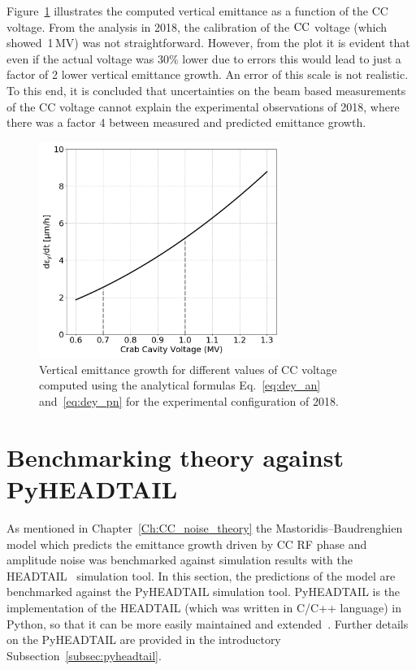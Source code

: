 Figure~\ref{fig:sensitivity_VCC_theory_bunch1} illustrates the computed vertical emittance as a function of the CC voltage. From the analysis in 2018, 
the calibration of the ${\mathrm{CC}}$ voltage (which showed~1\,MV) was not straightforward. However, from the plot it is evident that even if the actual voltage was 30$\%$ lower due to errors this would lead to just a factor of 2 lower vertical emittance growth. An error of this scale is not realistic. To this end, it is concluded that uncertainties on the beam based measurements of the CC voltage cannot explain the experimental observations of 2018, where there was a factor 4 between measured and predicted emittance growth.

\begin{figure}[!h]
    \centering         
    \includegraphics[width=0.7\textwidth]{images/Ch6/dey_vs_Vcc_Coast2-Setting2.png}
        \caption{Vertical emittance growth for different values of CC voltage computed using the analytical formulas Eq.~\eqref{eq:dey_an} and~\eqref{eq:dey_pn} for the experimental configuration of 2018.}
        \label{fig:sensitivity_VCC_theory_bunch1}
 \end{figure}

\section{Benchmarking theory against PyHEADTAIL}\label{sec:benchmark_theory_with_pyheadtail}

As mentioned in Chapter~\ref{Ch:CC_noise_theory} the Mastoridis--Baudrenghien model which predicts the emittance growth driven by CC RF phase and amplitude noise was benchmarked against simulation results with the HEADTAIL~\cite{PhysRevSTAB.18.101001} simulation tool. In this section, the predictions of the model are benchmarked against the PyHEADTAIL simulation tool. PyHEADTAIL is the implementation of the HEADTAIL (which was written in C/C++ language) in Python, so that it can be more easily maintained and extended~\cite{pyheadtail_schenk}. Further details on the PyHEADTAIL are provided in the introductory Subsection~\ref{subsec:pyheadtail}.

